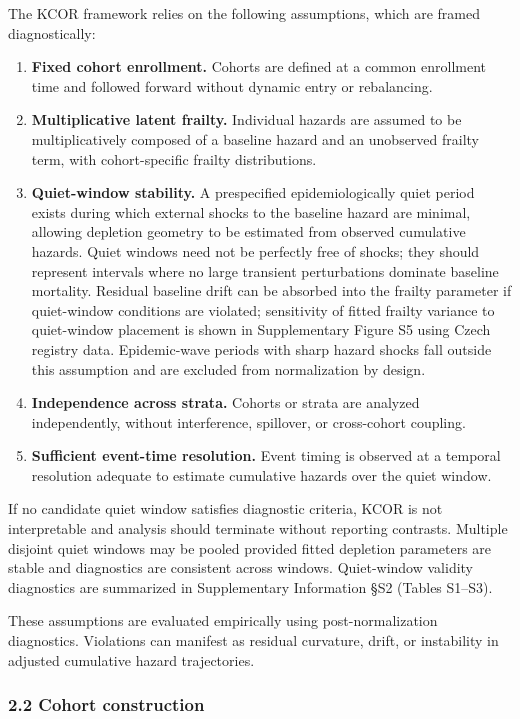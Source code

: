 \documentclass[
]{article}
\begin{document}
The KCOR framework relies on the following assumptions, which are framed diagnostically:

\begin{enumerate}
\def\labelenumi{\arabic{enumi}.}
\item
  \textbf{Fixed cohort enrollment.} Cohorts are defined at a common enrollment time and followed forward without dynamic entry or rebalancing.
\item
  \textbf{Multiplicative latent frailty.} Individual hazards are assumed to be multiplicatively composed of a baseline hazard and an unobserved frailty term, with cohort-specific frailty distributions.
\item
  \textbf{Quiet-window stability.} A prespecified epidemiologically quiet period exists during which external shocks to the baseline hazard are minimal, allowing depletion geometry to be estimated from observed cumulative hazards. Quiet windows need not be perfectly free of shocks; they should represent intervals where no large transient perturbations dominate baseline mortality. Residual baseline drift can be absorbed into the frailty parameter if quiet-window conditions are violated; sensitivity of fitted frailty variance to quiet-window placement is shown in Supplementary Figure S5 using Czech registry data. Epidemic-wave periods with sharp hazard shocks fall outside this assumption and are excluded from normalization by design.
\item
  \textbf{Independence across strata.} Cohorts or strata are analyzed independently, without interference, spillover, or cross-cohort coupling.
\item
  \textbf{Sufficient event-time resolution.} Event timing is observed at a temporal resolution adequate to estimate cumulative hazards over the quiet window.
\end{enumerate}

If no candidate quiet window satisfies diagnostic criteria, KCOR is not interpretable and analysis should terminate without reporting contrasts. Multiple disjoint quiet windows may be pooled provided fitted depletion parameters are stable and diagnostics are consistent across windows. Quiet-window validity diagnostics are summarized in Supplementary Information §S2 (Tables S1--S3).

These assumptions are evaluated empirically using post-normalization diagnostics. Violations can manifest as residual curvature, drift, or instability in adjusted cumulative hazard trajectories.

\subsubsection{2.2 Cohort construction}\label{cohort-construction}
\end{document}
